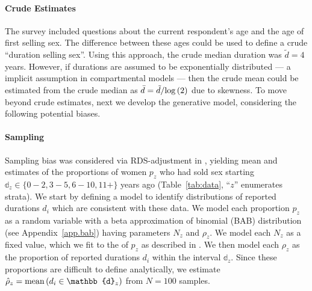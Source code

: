 \paragraph{Crude Estimates}
The survey \cite{Baral2014} included questions about
the current respondent's age and the age of first selling sex.
The difference between these ages could be used to define a crude ``duration selling sex''.
Using this approach, the crude median duration was $\tilde{d} = 4$ years.
However, if durations are assumed to be exponentially distributed
--- a implicit assumption in compartmental models \cite{Anderson1991} ---
then the crude mean could be estimated from the crude median as
$\bar{d} = \tilde{d}/\mathrm{log}\,(2)$ due to skewness.
To move beyond crude estimates, next we develop the generative model,
considering the following potential biases.
\paragraph{Sampling}
Sampling bias was considered via RDS-adjustment in \cite{Baral2014},
yielding mean and \ci estimates of the proportions of women $p_z$
who had sold sex starting $\mathbb{d}_z \in \{0{-}2, 3{-}5, 6{-}10, 11+\}$ years ago
(Table~\ref{tab:data}, ``$z$'' enumerates strata).
We start by defining a model to identify distributions of reported durations $d_i$
which are consistent with these data.
We model each proportion $p_z$ as a random variable with
a beta approximation of binomial (BAB) distribution (see Appendix~\ref{app.bab})
having parameters $N_z$ and $\rho_z$.
We model each $N_z$ as a fixed value,
which we fit to the \ci of $p_z$ as described in .
We then model each $\rho_z$ as
the proportion of reported durations $d_i$ within the interval $\mathbb{d}_z$.
Since these proportions are difficult to define analytically,
we estimate $\hat{\rho}_z = \distr{mean}{d_i \in \mathbb{d}_z}$ from $N = 100$ samples.
